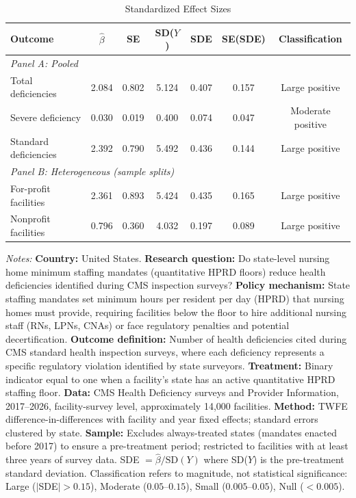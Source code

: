 \begin{table}[htbp]
\centering
\caption{Standardized Effect Sizes}
\label{tab:sde}
\begin{tabular}{lcccccc}
\hline\hline
Outcome & $\hat{\beta}$ & SE & SD($Y$) & SDE & SE(SDE) & Classification \\
\hline
\multicolumn{7}{l}{\textit{Panel A: Pooled}} \\
Total deficiencies & 2.084 & 0.802 & 5.124 & 0.407 & 0.157 & Large positive \\
Severe deficiency & 0.030 & 0.019 & 0.400 & 0.074 & 0.047 & Moderate positive \\
Standard deficiencies & 2.392 & 0.790 & 5.492 & 0.436 & 0.144 & Large positive \\
\hline
\multicolumn{7}{l}{\textit{Panel B: Heterogeneous (sample splits)}} \\
For-profit facilities & 2.361 & 0.893 & 5.424 & 0.435 & 0.165 & Large positive \\
Nonprofit facilities & 0.796 & 0.360 & 4.032 & 0.197 & 0.089 & Large positive \\
\hline\hline
\end{tabular}
\begin{tablenotes}[flushleft]
\small
\item \textit{Notes:} \textbf{Country:} United States. \textbf{Research question:} Do state-level nursing home minimum staffing mandates (quantitative HPRD floors) reduce health deficiencies identified during CMS inspection surveys? \textbf{Policy mechanism:} State staffing mandates set minimum hours per resident per day (HPRD) that nursing homes must provide, requiring facilities below the floor to hire additional nursing staff (RNs, LPNs, CNAs) or face regulatory penalties and potential decertification. \textbf{Outcome definition:} Number of health deficiencies cited during CMS standard health inspection surveys, where each deficiency represents a specific regulatory violation identified by state surveyors. \textbf{Treatment:} Binary indicator equal to one when a facility's state has an active quantitative HPRD staffing floor. \textbf{Data:} CMS Health Deficiency surveys and Provider Information, 2017--2026, facility-survey level, approximately 14,000 facilities. \textbf{Method:} TWFE difference-in-differences with facility and year fixed effects; standard errors clustered by state. \textbf{Sample:} Excludes always-treated states (mandates enacted before 2017) to ensure a pre-treatment period; restricted to facilities with at least three years of survey data. SDE $= \hat{\beta} / \text{SD}(Y)$ where SD($Y$) is the pre-treatment standard deviation. Classification refers to magnitude, not statistical significance: Large ($|$SDE$| > 0.15$), Moderate ($0.05$--$0.15$), Small ($0.005$--$0.05$), Null ($< 0.005$).
\end{tablenotes}
\end{table}
